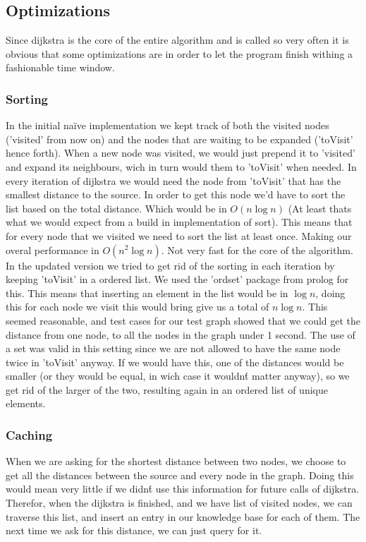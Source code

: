 \subsection{Optimizations}
	Since dijkstra is the core of the entire algorithm and is called so very often it is obvious that some optimizations are in order to let the program finish withing a fashionable time window.
\subsubsection{Sorting}
	In the initial na\"ive implementation we kept track of both the visited nodes ('visited' from now on) and the nodes that are waiting to be expanded ('toVisit' hence forth). When a new node was visited, we would just prepend it to 'visited' and expand its neighbours, wich in turn would them to 'toVisit' when needed.
	In every iteration of dijkstra we would need the node from 'toVisit' that has the smallest distance to the source. In order to get this node we'd have to sort the list based on the total distance. Which would be in $O(n\log n)$ (At least thats what we would expect from a build in implementation of sort).
	This means that for every node that we visited we need to sort the list at least once. Making our overal performance in $O(n^2\log n)$. Not very fast for the core of the algorithm. \\
	In the updated version we tried to get rid of the sorting in each iteration by keeping 'toVisit' in a ordered list. We used the 'ordset' package from prolog for this. This means that inserting an element in the list would be in $\log n$, doing this for each node we visit this would bring give us a total of $n\log n$. This seemed reasonable, and test cases for our test graph showed that we could get the distance from one node, to all the nodes in the graph under 1 second.
	The use of a set was valid in this setting since we are not allowed to have the same node twice in 'toVisit' anyway. If we would have this, one of the distances would be smaller (or they would be equal, in wich case it wouldn\'t matter anyway), so we get rid of the larger of the two, resulting again in an ordered list of unique elements.
\subsubsection{Caching}
When we are asking for the shortest distance between two nodes, we choose to get all the distances between the source and every node in the graph. Doing this would mean very little if we didn\'t use this information for future calls of dijkstra. Therefor, when the dijkstra is finished, and we have list of visited nodes, we can traverse this list, and insert an entry in our knowledge base for each of them. The next time we ask for this distance, we can just query for it.

